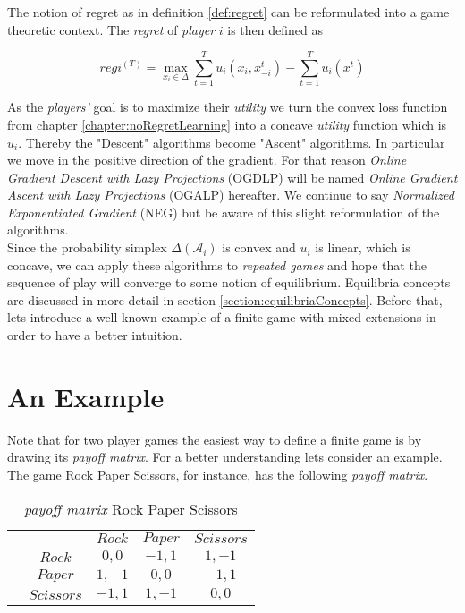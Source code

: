 The notion of regret as in definition \ref{def:regret} can be reformulated into a game theoretic context. The \textit{regret} of \textit{player} $i$ is then defined as

\begin{equation*}
    reg{i}^(T) = \max_{x_i \in \Delta}\sum_{t=1}^{T} u_i(x_i,x_{-i}^{t}) - \sum_{t=1}^{T}u_i(x^t)
\end{equation*}

As the \textit{players'} goal is to maximize their \textit{utility} we turn the convex loss function from chapter \ref{chapter:noRegretLearning} into a concave \textit{utility} function which is $u_i$. Thereby the "Descent" algorithms become "Ascent" algorithms. In particular we move in the positive direction of the gradient. For that reason \textit{Online Gradient Descent with Lazy Projections} (OGDLP) will be named \textit{Online Gradient Ascent with Lazy Projections} (OGALP) hereafter. We continue to say \textit{Normalized Exponentiated Gradient} (NEG) but be aware of this slight reformulation of the algorithms. \\

Since the probability simplex $\Delta(\mathcal{A}_i)$ is convex and $u_i$ is linear, which is concave, we can apply these algorithms to \textit{repeated games} and hope that the sequence of play will converge to some notion of equilibrium. Equilibria concepts are discussed in more detail in section \ref{section:equilibriaConcepts}. Before that, lets introduce a well known example of a finite game with mixed extensions in order to have a better intuition. 


\section{An Example}\label{section:anExample}

Note that for two player games the easiest way to define a finite game is by drawing its \textit{payoff matrix}. For a better understanding lets consider an example. The game Rock Paper Scissors, for instance, has the following \textit{payoff matrix}.\\

\begin{table}[H]\centering
\setlength{\extrarowheight}{2pt}
\begin{tabular}{cc|c|c|c|}
  & \multicolumn{1}{c}{} & \multicolumn{1}{c}{$Rock$}  & \multicolumn{1}{c}{$Paper$}  & \multicolumn{1}{c}{$Scissors$} \\\cline{3-5}
            & $Rock$ & $0,0$ & $-1,1$ & $1,-1$ \\ \cline{3-5}
            & $Paper$ & $1,-1$ & $0,0$ & $-1,1$ \\\cline{3-5}
            & $Scissors$ & $-1,1$ & $1,-1$ & $0,0$ \\\cline{3-5}
\end{tabular}\caption{\label{tab:payoffRPSFromDefinition}\textit{payoff matrix} Rock Paper Scissors}
\end{table}

